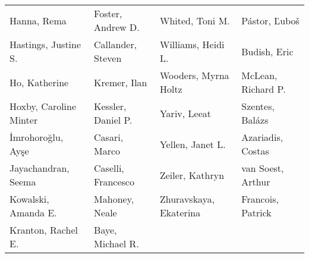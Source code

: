 \begin{ThreePartTable}
{\begin{longtable}[c]{llll}
            Hanna, Rema&Foster, Andrew D.&Whited, Toni M.&Pástor, Ľuboš\\
            Hastings, Justine S.&Callander, Steven&Williams, Heidi L.&Budish, Eric\\
            Ho, Katherine&Kremer, Ilan&Wooders, Myrna Holtz&McLean, Richard P.\\
            Hoxby, Caroline Minter&Kessler, Daniel P.&Yariv, Leeat&Szentes, Balázs\\
            İmrohoroğlu, Ayşe&Casari, Marco&Yellen, Janet L.&Azariadis, Costas\\
            Jayachandran, Seema&Caselli, Francesco&Zeiler, Kathryn&van Soest, Arthur\\
            Kowalski, Amanda E.&Mahoney, Neale&Zhuravskaya, Ekaterina&Francois, Patrick\\
            Kranton, Rachel E.&Baye, Michael R.&&\\
    \end{longtable}}
\end{ThreePartTable}
